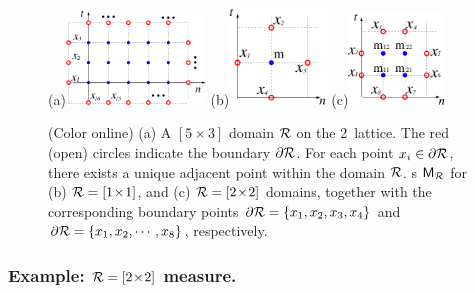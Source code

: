\documentclass[12pt]{iopart}
\begin{document}
\begin{figure}	
(a)\;\includegraphics[width=0.33\textwidth]{rectangular_domain}
\hspace{2mm}
(b)\;\includegraphics[width=0.23\textwidth]{symbol_block_one}
  \hspace{2mm}
(c)\;\includegraphics[width=0.23\textwidth]{symbol_block}
	\caption{\label{fig:block2x2}
(Color online)
(a) A $[5\!\times\!3]$ domain $\mathcal{R}$ on the
2\dmn\ lattice. The red (open) circles indicate the boundary
$\partial \mathcal{R}$. For each  point $x_i\in \partial\mathcal{R} $, there exists a unique
adjacent point within the domain $\mathcal{R}$.
{\Brick s} ${\mathsf{M}_{\mathcal{R}}}$ for
(b) $\mathcal{R} = [1\!\times\!1]$,  and
(c) $\mathcal{R} = [2\!\times\!2]$  domains, together with the corresponding
boundary points
$\partial\mathcal{R}=\{x_{1}, x_{2},  x_{3}, x_{4}\}$  and
$\partial\mathcal{R}=\{x_{1}, x_{2},  \cdots, x_{8}\}$, respectively.
   }
\end{figure}


\subsubsection{Example: $\mathcal{R} = [2\!\times\!2]$ measure.}
\label{exam:block2x2}
\end{document}
